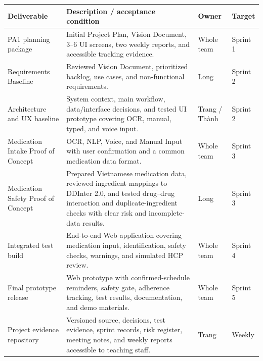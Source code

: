 \begin{longtable}{|L{0.24\textwidth}|L{0.41\textwidth}|L{0.13\textwidth}|L{0.12\textwidth}|}
\hline
\textbf{Deliverable} & \textbf{Description / acceptance condition} & \textbf{Owner} & 
\textbf{Target}\\ \hline

PA1 planning package & Initial Project Plan, Vision Document, 3--6 UI screens, two weekly reports, and accessible tracking evidence. & Whole team & Sprint 1\\ \hline

Requirements Baseline
& Reviewed Vision Document, prioritized backlog,
use cases, and non-functional requirements.
& Long & Sprint 2\\ \hline

Architecture and UX baseline & System context, main workflow, data/interface decisions, and tested UI prototype covering OCR, manual, typed, and voice input. & Trang / Thành & Sprint 2\\ \hline

Medication Intake Proof of Concept
& OCR, NLP, Voice, and Manual Input with user confirmation
and a common medication data format.
& Whole team & Sprint 3\\ \hline

Medication Safety Proof of Concept
& Prepared Vietnamese medication data, reviewed ingredient
mappings to DDInter 2.0, and tested drug--drug interaction
and duplicate-ingredient checks with clear risk and
incomplete-data results.
& Long & Sprint 3\\ \hline

Integrated test build
& End-to-end Web application covering medication
input, identification, safety checks, warnings,
and simulated HCP review.
& Whole team & Sprint 4\\ \hline

Final prototype release
& Web prototype with confirmed-schedule reminders,
safety gate, adherence tracking, test results,
documentation, and demo materials.
& Whole team & Sprint 5\\ \hline

Project evidence repository & Versioned source, decisions, test evidence, sprint records, risk register, meeting notes, and weekly reports accessible to teaching staff. & Trang & Weekly\\ \hline
\end{longtable}

